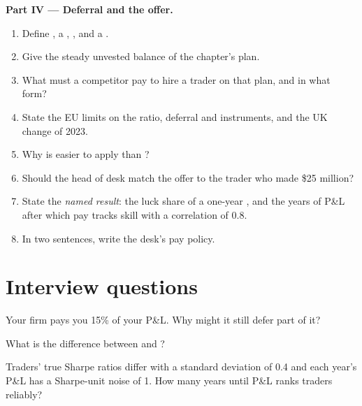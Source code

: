 \begin{problem}
\medskip\noindent\textbf{Part IV --- Deferral and the offer.}
\begin{enumerate}[resume]
\item Define , a , ,  and a .
\item Give the steady unvested balance of the chapter's plan.
\item What must a competitor pay to hire a trader on that plan, and in what form?
\item State the EU limits on the ratio, deferral and instruments, and the UK change of 2023.
\item Why is  easier to apply than ?
\item Should the head of desk match the offer to the trader who made \$25 million?
\item State the \emph{named result}: the luck share of a one-year , and the years of P\&L after which pay tracks skill with a
correlation of 0.8.
\item In two sentences, write the desk's pay policy.
\end{enumerate}
\end{problem}

\section{Interview questions}

\begin{interviewq}\label{iq:fm:hiring-and-compensation:1}
Your firm pays you 15\% of your P\&L. Why might it still defer part of it?
\end{interviewq}

\begin{interviewq}\label{iq:fm:hiring-and-compensation:2}
What is the difference between  and ?
\end{interviewq}

\begin{interviewq}\label{iq:fm:hiring-and-compensation:3}
Traders' true Sharpe ratios differ with a standard deviation of 0.4 and each year's P\&L has a Sharpe-unit noise of 1. How many years until P\&L
ranks traders reliably?
\end{interviewq}

